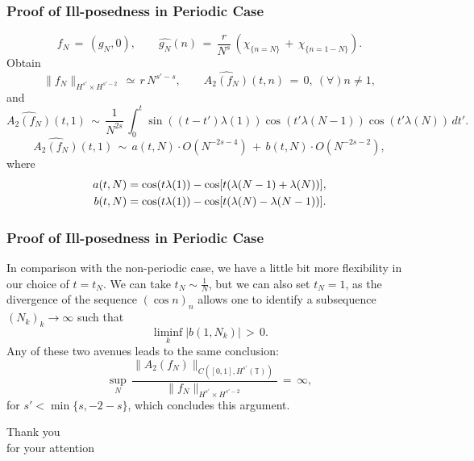 \documentclass{beamer}
\numberwithin{equation*}{section}
\begin{document}
\begin{frame}
\frametitle{Proof of Ill-posedness in Periodic Case}
\begin{equation*}
f_N\,=\,(g_N, 0), \qquad \widehat{g_N}(n)\,=\,\frac{r}{N^s} \,\left(\chi_{\{n=N\}}\,+\,\chi_{\{n=1-N\}}\right).
\end{equation*}
\pause
Obtain
\[
\|f_N\|_{H^{s'}\times H^{s'-2}}\,\simeq\,r\,N^{s'-s}, \qquad \widehat{A_2(f_N)}(t,n)\,=\,0, \ (\forall) n \neq 1,\]
and
\[
\widehat{A_2(f_N)}(t,1)\,\sim\,\frac{1}{N^{2s}}\,\int_0^t \sin((t-t') \lambda(1))\cos(t' \lambda(N-1))\cos(t'\lambda(N))\,dt'.
\]
\pause
\[
\widehat{A_2(f_N)}(t,1)\,\sim\,a(t,N)\cdot O(N^{-2s-4})\,+\,b(t,N)\cdot O(N^{-2s-2}),
\]
where
\[\aligned
a(t,N)&= \cos (t\lambda(1))-\cos[t(\lambda(N-1) + \lambda(N))],\\ b(t,N)&= \cos (t\lambda(1))-\cos[t(\lambda(N) - \lambda(N-1))].
\endaligned
\]
\end{frame}
\begin{frame}
\frametitle{Proof of Ill-posedness in Periodic Case}
In comparison with the non-periodic case, we have a little bit more flexibility in our choice of $t=t_N$. We can take $t_N \sim \frac{1}{N}$, but we can also set $t_N=1$, as the divergence of the sequence $(\cos n)_n$ allows one to identify a subsequence $(N_k)_k\to\infty$ such that 
\[
\liminf_k \left|b(1, N_k)\right|\,>\,0.
\]
\pause
Any of these two avenues leads to the same conclusion:
\[
\sup_N\,\frac{\|A_2(f_N)\|_{C([0,1], H^{s'}(\mathbb{T}))}}{\|f_N\|_{H^{s'}\times H^{s'-2}}}\,=\,\infty,\]
for $s'<\min\{s,-2-s\}$, which concludes this argument.
\end{frame}
\begin{frame}
\begin{center}\Large Thank you \\ for your attention
\end{center}
\end{frame}
\end{document}
